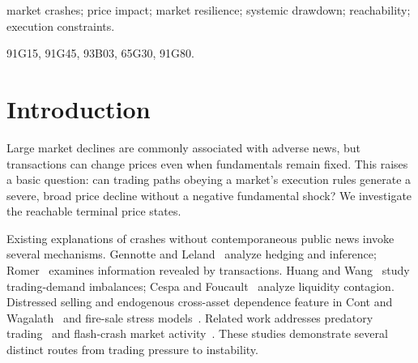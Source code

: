 \documentclass[review,hidelinks,onefignum,onetabnum]{siamonline250211}
\begin{document}
\raggedbottom
\maketitle
\begin{abstract}
Severe systemic price declines can be generated by admissible trading in an idealized multiasset market with fixed fundamentals, resilient price impact, paired-dollar execution, and zero terminal executed-dollar balances. A response-adapted price coordinate makes executed-dollar transfers additive, exposing a conservation law during trading and its interaction with recovery. We construct ten-asset paths in which all prices finish $50\%$ below their benchmarks and, separately, nine assets incur arbitrarily severe logarithmic losses under severity-independent finite turnover and inventory bounds. Under uniform $\pm25\%$ rolling price bands, a finite-rate path achieves two successive lower-limit closes for five assets, while a necessary bound excludes eight or more such closes; the maximal attainable coverage is unresolved. The certified path yields a $43.75\%$ target-asset loss and a geometric-index decline exceeding $16\%$. Elasticity barriers, a sharp full-coverage horizon bound, and execution-resource inequalities delimit these constructions.

\end{abstract}

\begin{keywords}market crashes; price impact; market resilience; systemic drawdown; reachability; execution constraints.\end{keywords}
\begin{MSCcodes}91G15, 91G45, 93B03, 65G30, 91G80.\end{MSCcodes}

\section{Introduction}\label{sec:intro}
Large market declines are commonly associated with adverse news, but transactions can change prices even when fundamentals remain fixed. This raises a basic question: can trading paths obeying a market's execution rules generate a severe, broad price decline without a negative fundamental shock? We investigate the reachable terminal price states.

Existing explanations of crashes without contemporaneous public news invoke several mechanisms. Gennotte and Leland~\citep{GennotteLeland1990} analyze hedging and inference; Romer~\citep{Romer1993} examines information revealed by transactions. Huang and Wang~\citep{HuangWang2009} study trading-demand imbalances; Cespa and Foucault~\citep{CespaFoucault2014} analyze liquidity contagion. Distressed selling and endogenous cross-asset dependence feature in Cont and Wagalath~\citep{ContWagalath2013} and fire-sale stress models~\citep{ContSchaanning2017}. Related work addresses predatory trading~\citep{BrunnermeierPedersen2005} and flash-crash market activity~\citep{KirilenkoEtAl2017}. These studies demonstrate several distinct routes from trading pressure to instability.
\end{document}
